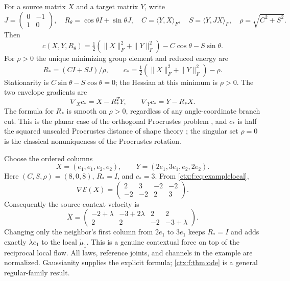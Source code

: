 For a source matrix $X$ and a target matrix $Y$, write
\begin{equation}
 J=\begin{pmatrix}0&-1\\1&0\end{pmatrix},\quad
 R_\theta=\cos\theta I+\sin\theta J,\quad
 C=\langle Y,X\rangle_F,\quad S=\langle Y,JX\rangle_F,\quad
 \rho=\sqrt{C^2+S^2}.
\end{equation}
Then
\begin{equation}
 c(X,Y,R_\theta)=\tfrac12(\|X\|_F^2+\|Y\|_F^2)-C\cos\theta-S\sin\theta.
\end{equation}
For $\rho>0$ the unique minimizing group element and reduced energy are
\begin{equation}
 R_*=(CI+SJ)/\rho,\qquad
 c_* =\tfrac12(\|X\|_F^2+\|Y\|_F^2)-\rho.
 \label{ctx:f:eq:procrustes}
\end{equation}
Stationarity is $C\sin\theta-S\cos\theta=0$; the Hessian at this minimum is $\rho>0$. The two envelope gradients are
\begin{equation}
 \nabla_Xc_*=X-R_*^TY,\qquad \nabla_Yc_*=Y-R_*X.
\end{equation}
The formula for $R_*$ is smooth on $\rho>0$, regardless of any angle-coordinate branch cut. This is the planar case of the orthogonal Procrustes problem \cite{Schonemann1966}, and $c_*$ is half the squared unscaled Procrustes distance of shape theory \cite{Kendall1984}; the singular set $\rho=0$ is the classical nonuniqueness of the Procrustes rotation.

Choose the ordered columns
\begin{equation}
 X=(e_1,e_1,e_2,e_2),\qquad
 Y=(2e_1,3e_1,e_2,2e_2).
\end{equation}
Here $(C,S,\rho)=(8,0,8)$, $R_*=I$, and $c_*=3$. From \cref{ctx:f:eq:examplelocal},
\begin{equation}
 \nabla\mathcal E(X)=
 \begin{pmatrix}2&3&-2&-2\\-2&-2&2&3\end{pmatrix}.
\end{equation}
Consequently the source-context velocity is
\begin{equation}
 \dot X=
 \begin{pmatrix}
 -2+\lambda&-3+2\lambda&2&2\\
 2&2&-2&-3+\lambda
 \end{pmatrix}.
 \label{ctx:f:eq:witnessvelocity}
\end{equation}
Changing only the neighbor's first column from $2e_1$ to $3e_1$ keeps $R_*=I$ and adds exactly $\lambda e_1$ to the local $\dot\mu_1$. This is a genuine contextual force on top of the reciprocal local flow. All laws, reference joints, and channels in the example are normalized. Gaussianity supplies the explicit formula; \cref{ctx:f:thm:ode} is a general regular-family result.

